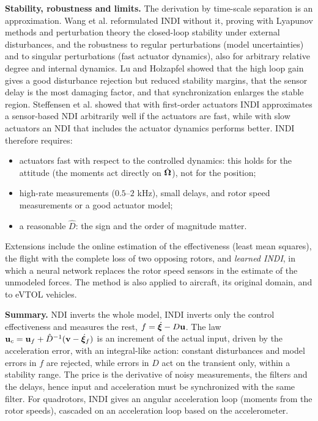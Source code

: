 \documentclass[10pt, a4paper]{report}
\begin{document}
\noindent\textbf{Stability, robustness and limits.} The derivation by time-scale separation is an approximation. Wang et al. reformulated INDI without it, proving with Lyapunov methods and perturbation theory the closed-loop stability under external disturbances, and the robustness to regular perturbations (model uncertainties) and to singular perturbations (fast actuator dynamics), also for arbitrary relative degree and internal dynamics. Lu and Holzapfel showed that the high loop gain gives a good disturbance rejection but reduced stability margins, that the sensor delay is the most damaging factor, and that synchronization enlarges the stable region. Steffensen et al. showed that with first-order actuators INDI approximates a sensor-based NDI arbitrarily well if the actuators are fast, while with slow actuators an NDI that includes the actuator dynamics performs better. INDI therefore requires:\begin{itemize}
    \item actuators fast with respect to the controlled dynamics: this holds for the attitude (the moments act directly on $\dot{{\boldsymbol{\Omega}}}$), not for the position;
    \item high-rate measurements ($0.5$--$2$ kHz), small delays, and rotor speed measurements or a good actuator model;
    \item a reasonable $\hat D$: the sign and the order of magnitude matter.
\end{itemize}
Extensions include the online estimation of the effectiveness (least mean squares), the flight with the complete loss of two opposing rotors, and \textit{learned INDI}, in which a neural network replaces the rotor speed sensors in the estimate of the unmodeled forces. The method is also applied to aircraft, its original domain, and to eVTOL vehicles.
\begin{boxobservation}{}{}
\textbf{Summary.} NDI inverts the whole model, INDI inverts only the control effectiveness and measures the rest, $f=\dot{{\boldsymbol{\xi}}}-D\mathbf u$. The law $\mathbf u_c=\mathbf u_f+\hat D^{-1}(\mathbf v-\dot{{\boldsymbol{\xi}}}_f)$ is an increment of the actual input, driven by the acceleration error, with an integral-like action: constant disturbances and model errors in $f$ are rejected, while errors in $D$ act on the transient only, within a stability range. The price is the derivative of noisy measurements, the filters and the delays, hence input and acceleration must be synchronized with the same filter. For quadrotors, INDI gives an angular acceleration loop (moments from the rotor speeds), cascaded on an acceleration loop based on the accelerometer.
\end{boxobservation}
\end{document}
